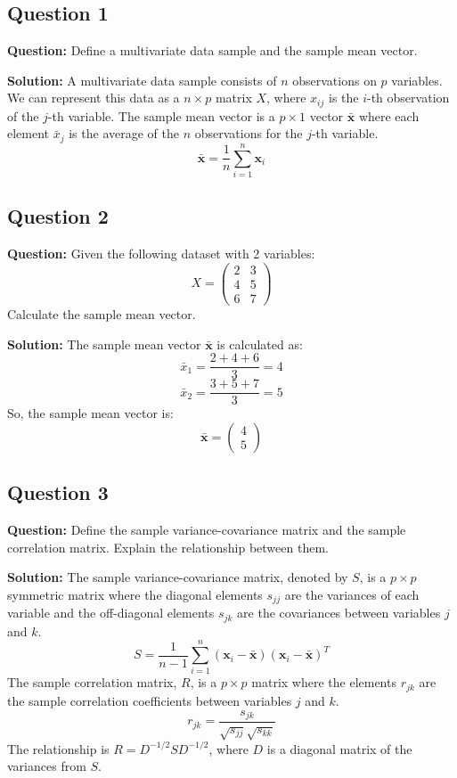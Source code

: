 \subsection*{Question 1}
\textbf{Question:} Define a multivariate data sample and the sample mean vector.

\textbf{Solution:}
A multivariate data sample consists of $n$ observations on $p$ variables. We can represent this data as a $n \times p$ matrix $X$, where $x_{ij}$ is the $i$-th observation of the $j$-th variable.
The sample mean vector is a $p \times 1$ vector $\bar{\mathbf{x}}$ where each element $\bar{x}_j$ is the average of the $n$ observations for the $j$-th variable.
$$ \bar{\mathbf{x}} = \frac{1}{n} \sum_{i=1}^{n} \mathbf{x}_i $$

\subsection*{Question 2}
\textbf{Question:} Given the following dataset with 2 variables:
$$ X = \begin{pmatrix} 2 & 3 \\ 4 & 5 \\ 6 & 7 \end{pmatrix} $$
Calculate the sample mean vector.

\textbf{Solution:}
The sample mean vector $\bar{\mathbf{x}}$ is calculated as:
$$ \bar{x}_1 = \frac{2+4+6}{3} = 4 $$
$$ \bar{x}_2 = \frac{3+5+7}{3} = 5 $$
So, the sample mean vector is:
$$ \bar{\mathbf{x}} = \begin{pmatrix} 4 \\ 5 \end{pmatrix} $$

\subsection*{Question 3}
\textbf{Question:} Define the sample variance-covariance matrix and the sample correlation matrix. Explain the relationship between them.

\textbf{Solution:}
The sample variance-covariance matrix, denoted by $S$, is a $p \times p$ symmetric matrix where the diagonal elements $s_{jj}$ are the variances of each variable and the off-diagonal elements $s_{jk}$ are the covariances between variables $j$ and $k$.
$$ S = \frac{1}{n-1} \sum_{i=1}^{n} (\mathbf{x}_i - \bar{\mathbf{x}})(\mathbf{x}_i - \bar{\mathbf{x}})^T $$
The sample correlation matrix, $R$, is a $p \times p$ matrix where the elements $r_{jk}$ are the sample correlation coefficients between variables $j$ and $k$.
$$ r_{jk} = \frac{s_{jk}}{\sqrt{s_{jj}}\sqrt{s_{kk}}} $$
The relationship is $R = D^{-1/2} S D^{-1/2}$, where $D$ is a diagonal matrix of the variances from $S$.

